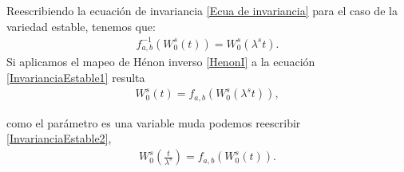 Reescribiendo la ecuación de invariancia \ref{Ecua de invariancia} para el caso de la variedad estable, tenemos que:
\begin{eqnarray}
f_{a,b}^{-1}(W_{0}^{s}(t))=W_{0}^{s}(\lambda^{s}t).
\label{InvarianciaEstable1}
\end{eqnarray}
Si aplicamos el mapeo de Hénon inverso \ref{HenonI} a la ecuación \ref{InvarianciaEstable1} resulta
\begin{eqnarray}
W_{0}^{s}(t)=f_{a,b}(W_{0}^{s}(\lambda^{s}t)),
\label{InvarianciaEstable2}
\end{eqnarray}

como el parámetro es una variable muda podemos reescribir \ref{InvarianciaEstable2}, 
\begin{eqnarray}
W_{0}^{s}(\frac{t}{\lambda^{s}})=f_{a,b}(W_{0}^{s}(t)).
\label{InvarianciaEstable3}
\end{eqnarray}

